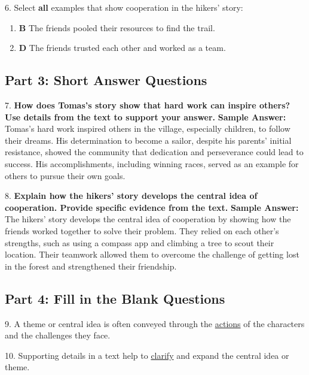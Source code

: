 \documentclass[12pt]{article}
\begin{document}
6. Select \textbf{all} examples that show cooperation in the hikers’ story:  
\begin{enumerate}[label=\Alph*.]
    \item \textbf{B} The friends pooled their resources to find the trail.  
    \item \textbf{D} The friends trusted each other and worked as a team.  
\end{enumerate}

\subsection*{Part 3: Short Answer Questions}

7. \textbf{How does Tomas’s story show that hard work can inspire others? Use details from the text to support your answer.}
\textbf{Sample Answer:} Tomas’s hard work inspired others in the village, especially children, to follow their dreams. His determination to become a sailor, despite his parents’ initial resistance, showed the community that dedication and perseverance could lead to success. His accomplishments, including winning races, served as an example for others to pursue their own goals.

8. \textbf{Explain how the hikers’ story develops the central idea of cooperation. Provide specific evidence from the text.}
\textbf{Sample Answer:} The hikers’ story develops the central idea of cooperation by showing how the friends worked together to solve their problem. They relied on each other’s strengths, such as using a compass app and climbing a tree to scout their location. Their teamwork allowed them to overcome the challenge of getting lost in the forest and strengthened their friendship.

\subsection*{Part 4: Fill in the Blank Questions}

9. A theme or central idea is often conveyed through the \underline{actions} of the characters and the challenges they face.

10. Supporting details in a text help to \underline{clarify} and expand the central idea or theme.
\end{document}
